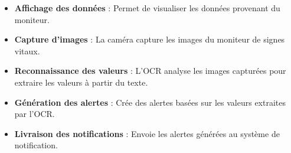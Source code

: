 \begin{itemize}
    \item \textbf{Affichage des données} : Permet de visualiser les données provenant du moniteur.
    \item \textbf{Capture d'images} : La caméra capture les images du moniteur de signes vitaux.
    \item \textbf{Reconnaissance des valeurs} : L'OCR analyse les images capturées pour extraire les valeurs à partir du texte.
    \item \textbf{Génération des alertes} : Crée des alertes basées sur les valeurs extraites par l'OCR.
    \item \textbf{Livraison des notifications} : Envoie les alertes générées au système de notification.
\end{itemize}